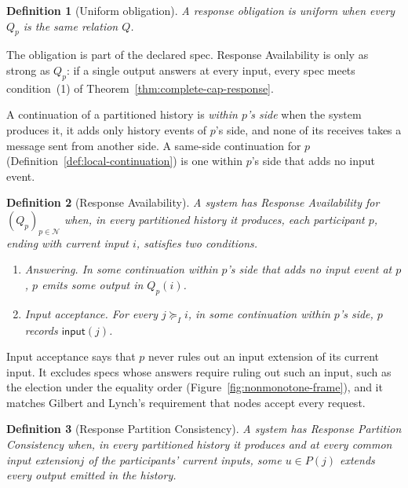 \documentclass[sigconf]{cidr-2027}
\newtheorem{definition}{Definition}
\theoremstyle{remark}
\newcommand{\InputGe}{\succeq_I}
\newcommand{\indesc}{input extension\xspace} %
\newcommand{\outrel}{extends\xspace}          %
\newcommand{\fiber}[1]{P(#1)}
\begin{document}
\begin{definition}[Uniform obligation]
\label{def:uniform-obligation}
A response obligation is \emph{uniform} when every $Q_p$ is the same
relation $Q$.
\end{definition}

The obligation is part of the declared spec. Response Availability is only
as strong as $Q_p$: if a single output answers at every input, every spec
meets condition~(1) of Theorem~\ref{thm:complete-cap-response}.

A continuation of a partitioned history is \emph{within $p$'s side} when
the system produces it, it adds only history events of $p$'s side, and none of its
receives takes a message sent from another side. A same-side continuation
for $p$ (Definition~\ref{def:local-continuation}) is one within $p$'s side
that adds no input event.

\begin{definition}[Response Availability]
\label{def:response-availability}
A system has \emph{Response Availability} for $(Q_p)_{p\in\mathcal N}$ when, in every
partitioned history it produces, each participant $p$, ending with current
input $i$, satisfies two conditions.
\begin{enumerate}
\item
\emph{Answering.}  In some continuation within $p$'s side that
        adds no input event at $p$, $p$ emits some output in $Q_p(i)$.
\item
\emph{Input acceptance.}  For every $j\InputGe i$, in some
        continuation within $p$'s side, $p$ records $\mathsf{input}(j)$.
\end{enumerate}
\end{definition}

Input acceptance says that $p$ never rules out an \indesc of its current
input. It excludes specs whose answers require ruling out such an input, such
as the election under the equality order (Figure~\ref{fig:nonmonotone-frame}),
and it matches Gilbert and Lynch's requirement that nodes accept every
request.

\begin{definition}[Response Partition Consistency]
\label{def:response-partition-consistency}
A system has \emph{Response Partition Consistency} when, in every partitioned
history it produces and at every common \indesc $j$ of the participants'
current inputs, some $u\in\fiber{j}$ \outrel every output emitted in the
history.
\end{definition}
\end{document}

